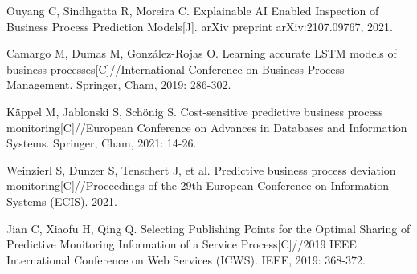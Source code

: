 \documentclass[runningheads]{llncs}
\begin{document}
\begin{thebibliography}{99}
	Ouyang C, Sindhgatta R, Moreira C. Explainable AI Enabled Inspection of Business Process Prediction Models[J]. arXiv preprint arXiv:2107.09767, 2021.
	
	Camargo M, Dumas M, González-Rojas O. Learning accurate LSTM models of business processes[C]//International Conference on Business Process Management. Springer, Cham, 2019: 286-302.
	
	Käppel M, Jablonski S, Schönig S. Cost-sensitive predictive business process monitoring[C]//European Conference on Advances in Databases and Information Systems. Springer, Cham, 2021: 14-26.
	
	Weinzierl S, Dunzer S, Tenschert J, et al. Predictive business process deviation monitoring[C]//Proceedings of the 29th European Conference on Information Systems (ECIS). 2021.
	
	Jian C, Xiaofu H, Qing Q. Selecting Publishing Points for the Optimal Sharing of Predictive Monitoring Information of a Service Process[C]//2019 IEEE International Conference on Web Services (ICWS). IEEE, 2019: 368-372.
		
	\end{thebibliography}

	
\end{document}
